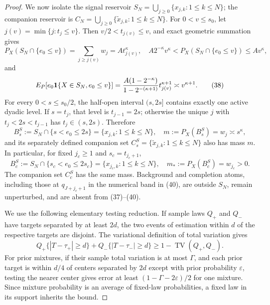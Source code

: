 \documentclass{article}
\begin{document}
\begin{proof}
We now isolate the signal reservoir
\(S_N=\bigcup_{j\geq0}\{x_{j,k}:1\leq k\leq N\}\); the companion reservoir
is \(C_N=\bigcup_{j\geq0}\{\widetilde x_{j,k}:1\leq k\leq N\}\).
For \(0<v\leq s_0\), let \(j(v)=\min\{j:t_j\leq v\}\).  Then
\(v/2<t_{j(v)}\leq v\), and exact geometric summation gives
\[
P_X(S_N\cap\{e_0\leq v\})
=\sum_{j\geq j(v)}w_j=A t_{j(v)}^\kappa,
\quad A2^{-\kappa}v^\kappa<P_X(S_N\cap\{e_0\leq v\})\leq Av^\kappa, \tag{37}
\]
and
\[
E_P[e_0\mathbf 1\{X\in S_N,e_0\leq v\}]
={A(1-2^{-\kappa})\over1-2^{-(\kappa+1)}}
t_{j(v)}^{\kappa+1}\asymp v^{\kappa+1}.                    \tag{38}
\]
For every \(0<s\leq s_0/2\), the half-open interval \((s,2s]\) contains
exactly one active dyadic level.  If \(s=t_j\), that level is
\(t_{j-1}=2s\); otherwise the unique \(j\) with
\(t_j<2s<t_{j-1}\) has \(t_j\in(s,2s)\).  Therefore
\[
B_s^S:=S_N\cap\{s<e_0\leq2s\}=\{x_{j,k}:1\leq k\leq N\},
\quad m:=P_X(B_s^S)=w_j\asymp s^\kappa,                    \tag{39}
\]
and its separately defined companion set
\(C_s^S=\{\widetilde x_{j,k}:1\leq k\leq N\}\) also has mass \(m\).
In particular, for fixed \(j_c\geq1\) and \(s_c=t_{j_c+1}\),
\[
B_c^S:=S_N\cap\{s_c<e_0\leq2s_c\}
=\{x_{j_c,k}:1\leq k\leq N\},\quad
m_*:=P_X(B_c^S)=w_{j_c}>0.                              \tag{40}
\]
The companion set \(C_c^S\) has the same mass.  Background and completion
atoms, including those at \(q_{J+j_c+1}\) in the numerical band in (40), are
outside \(S_N\), remain unperturbed, and are absent from (37)--(40).

We use the following elementary testing reduction.  If sample laws \(Q_+\) and
\(Q_-\) have targets separated by at least \(2d\), the two events of estimation
within \(d\) of the respective targets are disjoint.  The variational
definition of total variation gives
\[
Q_+\{|T-\tau_+|\geq d\}+Q_-\{|T-\tau_-|\geq d\}
\geq1-\operatorname{TV}(Q_+,Q_-).                         \tag{41}
\]
For prior mixtures, if their sample total variation is at most \(\Gamma\), and
each prior target is within \(d/4\) of centers separated by \(2d\) except with
prior probability \(\varepsilon\), testing the nearer center gives error at
least \((1-\Gamma-2\varepsilon)/2\) for one mixture.  Since mixture
probability is an average of fixed-law probabilities, a fixed law in its
support inherits the bound.


\end{proof}
\end{document}
